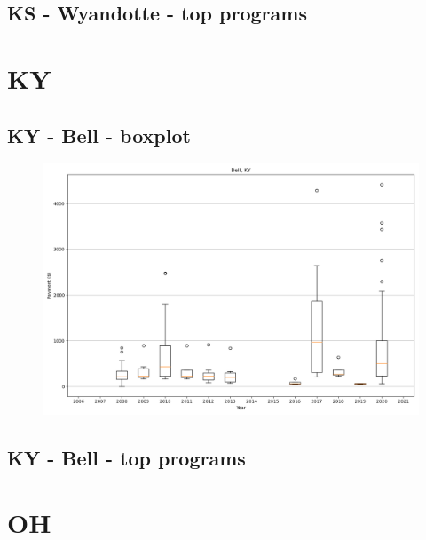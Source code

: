 \subsection*{KS - Wyandotte - top programs}

\newpage
\section*{KY}
\subsection*{KY - Bell - boxplot}
\begin{figure}[h]
\centering
\includegraphics[width=7in]{../output/boxplots/counties/Bell-KY_boxplot.png}
\end{figure}


\subsection*{KY - Bell - top programs}

\newpage
\section*{OH}
